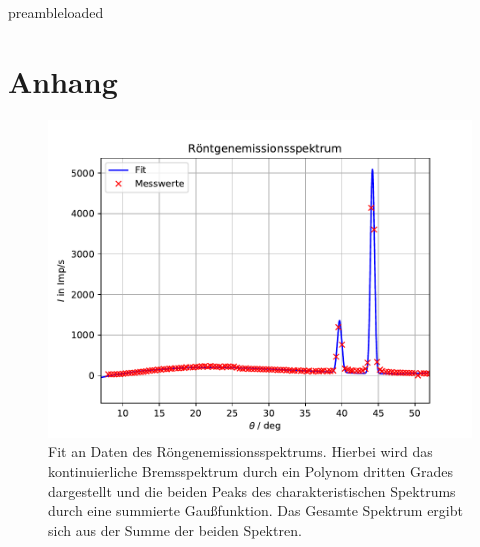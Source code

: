 \def\ifundefined#1{\expandafter\ifx\csname#1\endcsname\relax} \ifundefined{preambleloaded}
 \else
\typeout{\preambleloaded}
\fi



\maketitle
\newpage






\printbibliography
\newpage
\section{Anhang}
\begin{figure}
  \centering
  \includegraphics[width = \textwidth]{pics/schokolade.pdf}
  \caption{Fit an Daten des Röngenemissionsspektrums. Hierbei wird das kontinuierliche Bremsspektrum durch ein Polynom
  dritten Grades dargestellt und die beiden Peaks des charakteristischen Spektrums durch eine summierte Gaußfunktion. Das Gesamte
  Spektrum ergibt sich aus der Summe der beiden Spektren.}
  \label{fig: fit_emissionsspektrum}
\end{figure}

